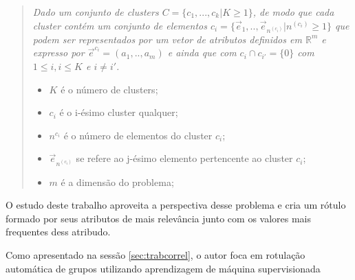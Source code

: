     \begin{quotation}

        \textit{ Dado um conjunto de clusters ${C=\{c_1,...,c_k | K \geqslant 1\} }$, de modo que cada cluster contém um conjunto de elementos ${c_i=\{\vec{e}_1,..,\vec{e}_{n^{(c_i)}}|n^{(c_i)} \geqslant 1 \}}$ que podem ser representados por um vetor de atributos definidos em ${\mathbb{R}^m }$ e expresso por ${ \vec{e}^{c_i}=(a_1,..,a_m)  }$ e ainda que  com ${ c_i \cap c_{i'}=\{0\} }$ com ${ 1 \leqslant i, i \leqslant K  }$ e ${ i \neq i' }$.
        }\footnotemark 
        \begin{itemize}[noitemsep]
            \item ${K}$ é o número de clusters;
            \item ${c_i}$ é o i-ésimo cluster qualquer;
            \item ${n^{c_i}}$ é o número de elementos do cluster ${c_i}$;
            \item ${\vec{e}_{n^{(c_i)}}}$ se refere ao j-ésimo elemento pertencente ao cluster ${c_i}$;
            \item ${m}$ é a dimensão do problema;
        \end{itemize}
    \end{quotation}


O estudo deste trabalho aproveita a perspectiva desse problema e cria um rótulo formado por seus atributos de mais relevância junto com os valores mais frequentes dess atribudo.

Como apresentado na sessão \ref{sec:trabcorrel}, o autor foca em rotulação automática de grupos utilizando aprendizagem de máquina supervisionada

